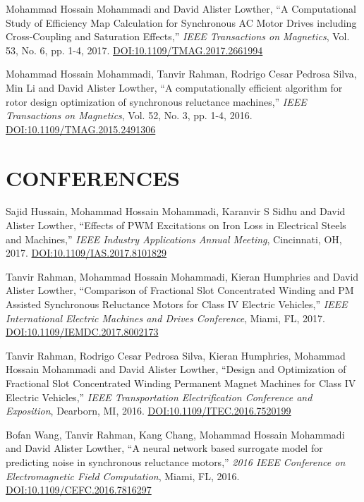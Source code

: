 Mohammad Hossain Mohammadi and David Alister Lowther, ``A Computational Study of Efficiency Map Calculation for Synchronous AC Motor Drives including Cross-Coupling and Saturation Effects,'' \textit{IEEE Transactions on Magnetics}, Vol. 53, No. 6, pp. 1-4, 2017. \n\href{https://doi.org/10.1109/TMAG.2017.2661994}{DOI:10.1109/TMAG.2017.2661994}

Mohammad Hossain Mohammadi, Tanvir Rahman, Rodrigo Cesar Pedrosa Silva, Min Li and David Alister Lowther, ``A computationally efficient algorithm for rotor design optimization of synchronous reluctance machines,'' \textit{IEEE Transactions on Magnetics}, Vol. 52, No. 3, pp. 1-4, 2016. \n\href{https://doi.org/10.1109/TMAG.2015.2491306}{DOI:10.1109/TMAG.2015.2491306}


\section{CONFERENCES}

Sajid Hussain, Mohammad Hossain Mohammadi, Karanvir S Sidhu and David Alister Lowther, ``Effects of PWM Excitations on Iron Loss in Electrical Steels and Machines,'' \textit{IEEE Industry Applications Annual Meeting}, Cincinnati, OH,  2017. \n\href{https://doi.org/10.1109/IAS.2017.8101829}{DOI:10.1109/IAS.2017.8101829}

Tanvir Rahman, Mohammad Hossain Mohammadi, Kieran Humphries and David Alister Lowther, ``Comparison of Fractional Slot Concentrated Winding and PM Assisted Synchronous Reluctance Motors for Class IV Electric Vehicles,'' \textit{IEEE International Electric Machines and Drives Conference}, Miami, FL,  2017. \n\href{https://doi.org/10.1109/IEMDC.2017.8002173}{DOI:10.1109/IEMDC.2017.8002173}

Tanvir Rahman, Rodrigo Cesar Pedrosa Silva, Kieran Humphries, Mohammad Hossain Mohammadi and David Alister Lowther, ``Design and Optimization of Fractional Slot Concentrated Winding Permanent Magnet Machines for Class IV Electric Vehicles,'' \textit{IEEE Transportation Electrification Conference and Exposition}, Dearborn, MI,  2016. \n\href{https://doi.org/10.1109/ITEC.2016.7520199}{DOI:10.1109/ITEC.2016.7520199}

Bofan Wang, Tanvir Rahman, Kang Chang, Mohammad Hossain Mohammadi and David Alister Lowther, ``A neural network based surrogate model for predicting noise in synchronous reluctance motors,'' \textit{2016 IEEE Conference on Electromagnetic Field Computation}, Miami, FL,  2016. \n\href{https://doi.org/10.1109/CEFC.2016.7816297}{DOI:10.1109/CEFC.2016.7816297}

